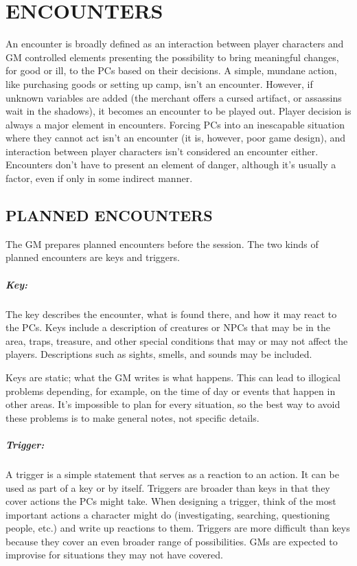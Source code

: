 \chapter{ENCOUNTERS}

\begin{multicols}{2}

An encounter is broadly defined as an interaction between player characters and GM controlled elements presenting the possibility to bring meaningful changes, for good or ill, to the PCs based on their decisions.  A simple, mundane action, like purchasing goods or setting up camp, isn't an encounter. However, if unknown variables are added (the merchant offers a cursed artifact, or assassins wait in the shadows), it becomes an encounter to be played out.   Player decision is always a major element in encounters.  Forcing PCs into an inescapable situation where they cannot act isn't an encounter (it is, however, poor game design), and interaction between player characters isn't considered an encounter either.  Encounters don't have to present an element of danger, although it's usually a factor, even if only in some indirect manner.  

\section{PLANNED ENCOUNTERS}

The GM prepares planned encounters before the session.  The two kinds of planned encounters are keys and triggers.

\paragraph{Key:} The key describes the encounter, what is found there, and how it may react to the PCs.  Keys include a description of creatures or NPCs that may be in the area, traps, treasure, and other special conditions that may or may not affect the players. Descriptions such as sights, smells, and sounds may be included.  

Keys are static; what the GM writes is what happens.  This can lead to illogical problems depending, for example, on the time of day or events that happen in other areas.  It's impossible to plan for every situation, so the best way to avoid these problems is to make general notes, not specific details.  

\paragraph{Trigger:} A trigger is a simple statement that serves as a reaction to an action.  It can be used as part of a key or by itself.  Triggers are broader than keys in that they cover actions the PCs might take.  When designing a trigger, think of the most important actions a character might do (investigating, searching, questioning people, etc.) and write up reactions to them.  Triggers are more difficult than keys because they cover an even broader range of possibilities.  GMs are expected to improvise for situations they may not have covered.


\end{multicols}
